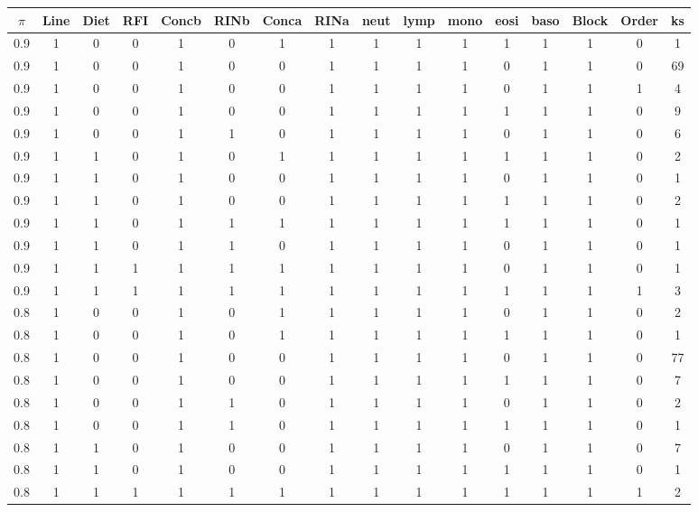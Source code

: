 \documentclass[12pt, letter]{article}\usepackage[]{graphicx}\usepackage[]{color}
\begin{document}
\begin{table}[ht]
\centering
{\scriptsize
\begin{tabular}{|c|cccccccccccccc|c|}
  \hline
$\pi$ & Line & Diet & RFI & Concb & RINb & Conca & RINa & neut & lymp & mono & eosi & baso & Block & Order & ks \\ 
  \hline
0.9 & 1 & 0 & 0 & 1 & 0 & 1 & 1 & 1 & 1 & 1 & 1 & 1 & 1 & 0 & 1 \\ 
  0.9 & 1 & 0 & 0 & 1 & 0 & 0 & 1 & 1 & 1 & 1 & 0 & 1 & 1 & 0 & 69 \\ 
  0.9 & 1 & 0 & 0 & 1 & 0 & 0 & 1 & 1 & 1 & 1 & 0 & 1 & 1 & 1 & 4 \\ 
  0.9 & 1 & 0 & 0 & 1 & 0 & 0 & 1 & 1 & 1 & 1 & 1 & 1 & 1 & 0 & 9 \\ 
  0.9 & 1 & 0 & 0 & 1 & 1 & 0 & 1 & 1 & 1 & 1 & 0 & 1 & 1 & 0 & 6 \\ 
  0.9 & 1 & 1 & 0 & 1 & 0 & 1 & 1 & 1 & 1 & 1 & 1 & 1 & 1 & 0 & 2 \\ 
  0.9 & 1 & 1 & 0 & 1 & 0 & 0 & 1 & 1 & 1 & 1 & 0 & 1 & 1 & 0 & 1 \\ 
  0.9 & 1 & 1 & 0 & 1 & 0 & 0 & 1 & 1 & 1 & 1 & 1 & 1 & 1 & 0 & 2 \\ 
  0.9 & 1 & 1 & 0 & 1 & 1 & 1 & 1 & 1 & 1 & 1 & 1 & 1 & 1 & 0 & 1 \\ 
  0.9 & 1 & 1 & 0 & 1 & 1 & 0 & 1 & 1 & 1 & 1 & 0 & 1 & 1 & 0 & 1 \\ 
  0.9 & 1 & 1 & 1 & 1 & 1 & 1 & 1 & 1 & 1 & 1 & 0 & 1 & 1 & 0 & 1 \\ 
  0.9 & 1 & 1 & 1 & 1 & 1 & 1 & 1 & 1 & 1 & 1 & 1 & 1 & 1 & 1 & 3 \\ 
   \hline
0.8 & 1 & 0 & 0 & 1 & 0 & 1 & 1 & 1 & 1 & 1 & 0 & 1 & 1 & 0 & 2 \\ 
  0.8 & 1 & 0 & 0 & 1 & 0 & 1 & 1 & 1 & 1 & 1 & 1 & 1 & 1 & 0 & 1 \\ 
  0.8 & 1 & 0 & 0 & 1 & 0 & 0 & 1 & 1 & 1 & 1 & 0 & 1 & 1 & 0 & 77 \\ 
  0.8 & 1 & 0 & 0 & 1 & 0 & 0 & 1 & 1 & 1 & 1 & 1 & 1 & 1 & 0 & 7 \\ 
  0.8 & 1 & 0 & 0 & 1 & 1 & 0 & 1 & 1 & 1 & 1 & 0 & 1 & 1 & 0 & 2 \\ 
  0.8 & 1 & 0 & 0 & 1 & 1 & 0 & 1 & 1 & 1 & 1 & 1 & 1 & 1 & 0 & 1 \\ 
  0.8 & 1 & 1 & 0 & 1 & 0 & 0 & 1 & 1 & 1 & 1 & 0 & 1 & 1 & 0 & 7 \\ 
  0.8 & 1 & 1 & 0 & 1 & 0 & 0 & 1 & 1 & 1 & 1 & 1 & 1 & 1 & 0 & 1 \\ 
  0.8 & 1 & 1 & 1 & 1 & 1 & 1 & 1 & 1 & 1 & 1 & 1 & 1 & 1 & 1 & 2 \\ 

\end{tabular}}
\end{table}
\end{document}
